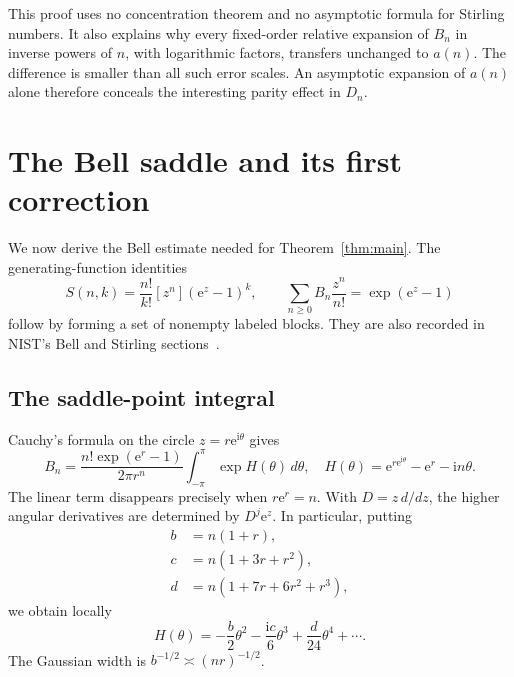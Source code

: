 \documentclass[11pt,a4paper]{article}
\numberwithin{equation}{section}
\theoremstyle{remark}
\newcommand{\e}{\mathrm e}
\newcommand{\ii}{\mathrm i}
\newcommand{\coef}[2]{[#1^{#2}]}
\begin{document}
This proof uses no concentration theorem and no asymptotic formula for
Stirling numbers. It also explains why every fixed-order relative
expansion of $B_n$ in inverse powers of $n$, with logarithmic factors,
transfers unchanged to $a(n)$. The difference is smaller than all such
error scales. An asymptotic expansion of $a(n)$ alone therefore conceals
the interesting parity effect in $D_n$.

\section{The Bell saddle and its first correction}\label{sec:bell}

We now derive the Bell estimate needed for Theorem~\ref{thm:main}.
The generating-function identities
\begin{equation}\label{eq:egfs}
 S(n,k)=\frac{n!}{k!}\coef zn(\e^z-1)^k,
 \qquad
 \sum_{n\ge0}B_n\frac{z^n}{n!}=\exp(\e^z-1)
\end{equation}
follow by forming a set of nonempty labeled blocks. They are also recorded
in NIST's Bell and Stirling sections~\cite{dlmf-bell,dlmf-stirling}.

\subsection{The saddle-point integral}
Cauchy's formula on the circle $z=r\e^{\ii\theta}$ gives
\begin{equation}\label{eq:bellintegral}
 B_n=\frac{n!\exp(\e^r-1)}{2\pi r^n}
 \int_{-\pi}^{\pi}\exp H(\theta)\,d\theta,
 \quad
 H(\theta)=\e^{r\e^{\ii\theta}}-\e^r-\ii n\theta.
\end{equation}
The linear term disappears precisely when $r\e^r=n$.
With $D=z\,d/dz$, the higher angular derivatives are determined by
$D^j\e^z$. In particular, putting
\begin{align}
 b&=n(1+r),\label{eq:bcdb}\\
 c&=n(1+3r+r^2),\\
 d&=n(1+7r+6r^2+r^3),\label{eq:bcdd}
\end{align}
we obtain locally
\begin{equation}\label{eq:hexpand}
 H(\theta)=-\frac b2\theta^2-\frac{\ii c}{6}\theta^3
 +\frac d{24}\theta^4+\cdots.
\end{equation}
The Gaussian width is $b^{-1/2}\asymp(nr)^{-1/2}$.
\end{document}
